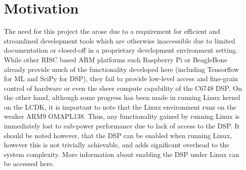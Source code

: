 
\section{Motivation}

The need for this project the arose due to a requirement for efficient and streamlined development tools which are otherwise inaccessible due to limited documentation or closed-off in a proprietary development environment setting. While other RISC based ARM platforms such Raspberry Pi or BeagleBone already provide much of the functionality developed here (including Tensorflow for ML and SciPy for DSP), they fail to provide low-level access and fine-grain control of hardware or even the sheer compute capability of the C6748 DSP. On the other hand, although some progress has been made in running Linux kernel on the LCDK, it is important to note that the Linux environment runs on the weaker ARM9 OMAPL138. Thus, any functionality gained by running Linux is immediately lost to sub-power performance due to lack of access to the DSP. It should be noted however, that the DSP can be enabled when running Linux, however this is not trivially achievable, and adds significant overhead to the system complexity. More information about enabling the DSP under Linux can be accessed here\cite{linux}.
